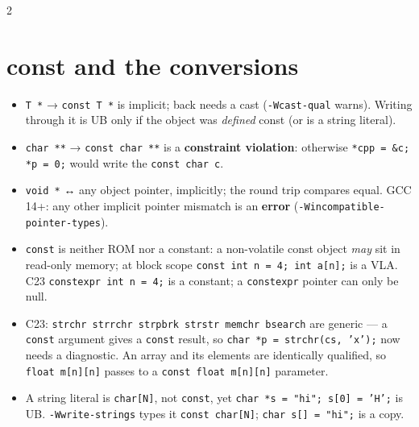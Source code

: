 \documentclass[8pt]{extarticle}
\newcommand\ct[1]{\texttt{#1}}
\begin{document}
\begin{multicols}{2}
\section{const and the conversions}
\begin{itemize}
  \item \ct{T *} → \ct{const T *} is implicit; back needs a cast (\ct{-Wcast-qual} warns).
        Writing through it is UB only if the object was \emph{defined} const (or is a string
        literal).
  \item \ct{char **} → \ct{const char **} is a \textbf{constraint violation}: otherwise
        \ct{*cpp = \&c; *p = 0;} would write the \ct{const char c}.
  \item \ct{void *} ↔ any object pointer, implicitly; the round trip compares equal. GCC 14+:
        any other implicit pointer mismatch is an \textbf{error}
        (\ct{-Wincompatible-pointer-types}).
  \item \ct{const} is neither ROM nor a constant: a non-volatile const object \emph{may} sit in
        read-only memory; at block scope \ct{const int n = 4; int a[n];} is a VLA. C23
        \ct{constexpr int n = 4;} is a constant; a \ct{constexpr} pointer can only be null.
  \item C23: \ct{strchr strrchr strpbrk strstr memchr bsearch} are generic — a \ct{const}
        argument gives a \ct{const} result, so \ct{char *p = strchr(cs, 'x');} now needs a
        diagnostic. An array and its elements are identically qualified, so
        \ct{float m[n][n]} passes to a \ct{const float m[n][n]} parameter.
  \item A string literal is \ct{char[N]}, not \ct{const}, yet \ct{char *s = "hi"; s[0] = 'H';}
        is UB. \ct{-Wwrite-strings} types it \ct{const char[N]}; \ct{char s[] = "hi";} is a copy.
\end{itemize}


\end{multicols}
\end{document}
